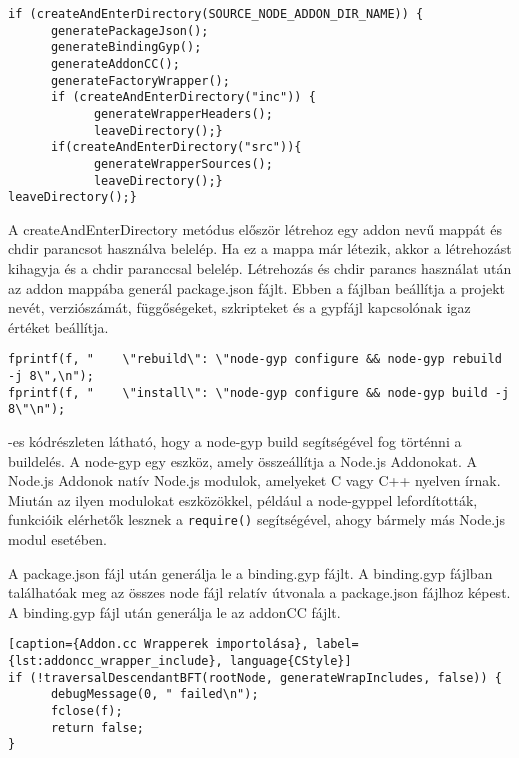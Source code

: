 \pagebreak
\begin{lstlisting}[caption={SchemaGenerator JavaScriptAddon generálás},label={lst:schemagenerator_genNodeAddon_check}, language={CStyle}]
if (createAndEnterDirectory(SOURCE_NODE_ADDON_DIR_NAME)) {
      generatePackageJson();
      generateBindingGyp();
      generateAddonCC();
      generateFactoryWrapper();
      if (createAndEnterDirectory("inc")) {
            generateWrapperHeaders();
            leaveDirectory();}
      if(createAndEnterDirectory("src")){
            generateWrapperSources();
            leaveDirectory();}
leaveDirectory();}
\end{lstlisting}

A createAndEnterDirectory metódus először létrehoz egy addon nevű mappát és chdir parancsot használva belelép.
Ha ez a mappa már létezik, akkor a létrehozást kihagyja és a chdir paranccsal belelép.
Létrehozás és chdir parancs használat után az addon mappába generál package.json fájlt.
Ebben a fájlban beállítja a projekt nevét, verziószámát, függőségeket, szkripteket és a gypfájl kapcsolónak igaz értéket beállítja.

\begin{lstlisting}[caption={NodeAddonGenerator package.json szkriptek}, label={lst:nodeAddonGenerator_package_json}, language={CStyle}]
fprintf(f, "    \"rebuild\": \"node-gyp configure && node-gyp rebuild -j 8\",\n");
fprintf(f, "    \"install\": \"node-gyp configure && node-gyp build -j 8\"\n");
\end{lstlisting}

-es kódrészleten látható, hogy a node-gyp build segítségével fog történni a buildelés.
A node-gyp egy eszköz, amely összeállítja a Node.js Addonokat. A Node.js Addonok natív Node.js modulok, amelyeket C vagy C++ nyelven írnak.
Miután az ilyen modulokat eszközökkel, például a node-gyppel lefordították, funkcióik elérhetők lesznek a \texttt{require()} segítségével, ahogy bármely más Node.js modul esetében.


A package.json fájl után generálja le a binding.gyp fájlt.
A binding.gyp fájlban találhatóak meg az összes node fájl relatív útvonala a package.json fájlhoz képest.
A binding.gyp fájl után generálja le az addonCC fájlt.

\begin{lstlisting}[caption={Addon.cc Wrapperek importolása}, label={lst:addoncc_wrapper_include}, language{CStyle}]
if (!traversalDescendantBFT(rootNode, generateWrapIncludes, false)) {
      debugMessage(0, " failed\n");
      fclose(f);
      return false;
}
\end{lstlisting}


